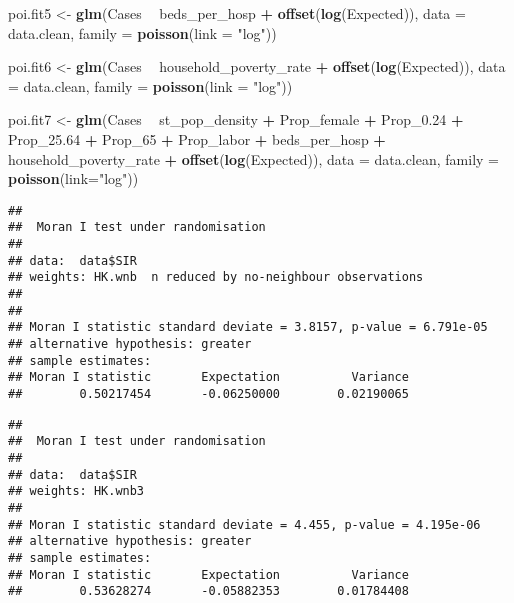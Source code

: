 \documentclass[]{article}
\newenvironment{Shaded}{\begin{snugshade}}{\end{snugshade}}
\newcommand{\DataTypeTok}[1]{\textcolor[rgb]{0.13,0.29,0.53}{#1}}
\newcommand{\DecValTok}[1]{\textcolor[rgb]{0.00,0.00,0.81}{#1}}
\newcommand{\FloatTok}[1]{\textcolor[rgb]{0.00,0.00,0.81}{#1}}
\newcommand{\KeywordTok}[1]{\textcolor[rgb]{0.13,0.29,0.53}{\textbf{#1}}}
\newcommand{\NormalTok}[1]{#1}
\newcommand{\OperatorTok}[1]{\textcolor[rgb]{0.81,0.36,0.00}{\textbf{#1}}}
\newcommand{\StringTok}[1]{\textcolor[rgb]{0.31,0.60,0.02}{#1}}
\begin{document}
\begin{Shaded}
\begin{Highlighting}[]
\NormalTok{poi.fit5 <-}\StringTok{ }\KeywordTok{glm}\NormalTok{(Cases }\OperatorTok{~}\StringTok{ }\NormalTok{beds_per_hosp }\OperatorTok{+}\StringTok{ }\KeywordTok{offset}\NormalTok{(}\KeywordTok{log}\NormalTok{(Expected)), }
                \DataTypeTok{data =}\NormalTok{ data.clean, }\DataTypeTok{family =} \KeywordTok{poisson}\NormalTok{(}\DataTypeTok{link =} \StringTok{"log"}\NormalTok{))}

\NormalTok{poi.fit6 <-}\StringTok{ }\KeywordTok{glm}\NormalTok{(Cases }\OperatorTok{~}\StringTok{ }\NormalTok{household_poverty_rate }\OperatorTok{+}\StringTok{ }\KeywordTok{offset}\NormalTok{(}\KeywordTok{log}\NormalTok{(Expected)), }
                \DataTypeTok{data =}\NormalTok{ data.clean, }\DataTypeTok{family =} \KeywordTok{poisson}\NormalTok{(}\DataTypeTok{link =} \StringTok{"log"}\NormalTok{))}

\NormalTok{poi.fit7 <-}\StringTok{ }\KeywordTok{glm}\NormalTok{(Cases }\OperatorTok{~}\StringTok{ }\NormalTok{st_pop_density }\OperatorTok{+}\StringTok{ }\NormalTok{Prop_female }\OperatorTok{+}\StringTok{ }\NormalTok{Prop_}\FloatTok{0.24} \OperatorTok{+}\StringTok{ }\NormalTok{Prop_}\FloatTok{25.64} \OperatorTok{+}\StringTok{ }\NormalTok{Prop_}\DecValTok{65} \OperatorTok{+}\StringTok{ }
\StringTok{                }\NormalTok{Prop_labor }\OperatorTok{+}\StringTok{ }\NormalTok{beds_per_hosp }\OperatorTok{+}\StringTok{ }\NormalTok{household_poverty_rate }\OperatorTok{+}\StringTok{ }\KeywordTok{offset}\NormalTok{(}\KeywordTok{log}\NormalTok{(Expected)), }
                \DataTypeTok{data =}\NormalTok{ data.clean, }\DataTypeTok{family =} \KeywordTok{poisson}\NormalTok{(}\DataTypeTok{link=}\StringTok{"log"}\NormalTok{))}
\end{Highlighting}
\end{Shaded}

\begin{verbatim}
## 
##  Moran I test under randomisation
## 
## data:  data$SIR  
## weights: HK.wnb  n reduced by no-neighbour observations
##   
## 
## Moran I statistic standard deviate = 3.8157, p-value = 6.791e-05
## alternative hypothesis: greater
## sample estimates:
## Moran I statistic       Expectation          Variance 
##        0.50217454       -0.06250000        0.02190065
\end{verbatim}

\begin{verbatim}
## 
##  Moran I test under randomisation
## 
## data:  data$SIR  
## weights: HK.wnb3    
## 
## Moran I statistic standard deviate = 4.455, p-value = 4.195e-06
## alternative hypothesis: greater
## sample estimates:
## Moran I statistic       Expectation          Variance 
##        0.53628274       -0.05882353        0.01784408
\end{verbatim}
\end{document}
